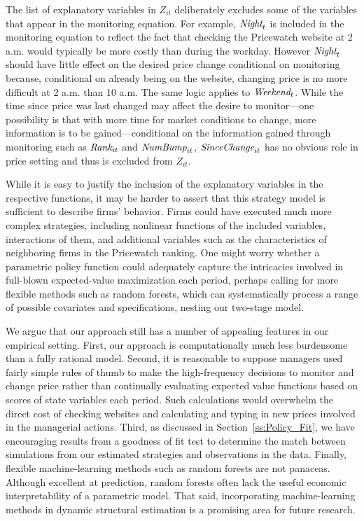 \documentclass[11pt]{article}
\newcommand{\SinceChange}{\mbox{\it SinceChange}}
\newcommand{\Rank}{\mbox{\it Rank}}
\newcommand{\NumBump}{\mbox{\it NumBump}}
\newcommand{\Night}{\mbox{\it Night}}
\newcommand{\Weekend}{\mbox{\it Weekend}}
\begin{document}
\begin{spacing}{1.3}
The list of explanatory variables in $Z_{it}$ deliberately excludes
some of the variables that appear in the monitoring equation. For
example, $\Night_t$ is included in the monitoring equation to reflect
the fact that checking the Pricewatch website at 2 a.m. would
typically be more costly than during the workday. However $\Night_t$
should have little effect on the desired price change conditional on
monitoring because, conditional on already being on the website,
changing price is no more difficult at 2 a.m. than 10 a.m. The same
logic applies to $\Weekend_t$. While the time since price was last
changed may affect the desire to monitor---one possibility is that
with more time for market conditions to change, more information is to
be gained---conditional on the information gained through monitoring
such as $\Rank_{it}$ and $\NumBump_{it}$, $\SinceChange_{it}$ has no
obvious role in price setting and thus is excluded from $Z_{it}$.

While it is easy to justify the inclusion of the explanatory variables
in the respective functions, it may be harder to assert that this
strategy model is sufficient to describe firms' behavior. Firms could
have executed much more complex strategies, including nonlinear
functions of the included variables, interactions of them, and
additional variables such as the characteristics of neighboring firms
in the Pricewatch ranking. One might worry whether a parametric policy
function could adequately capture the intricacies involved in
full-blown expected-value maximization each period, perhaps calling
for more flexible methods such as random forests, which can
systematically process a range of possible covariates and specifications,
nesting our two-stage model.

We argue that our approach still has a number of appealing features in
our empirical setting. First, our approach is computationally much
less burdensome than a fully rational model. Second, it is reasonable
to suppose managers used fairly simple rules of thumb to make the
high-frequency decisions to monitor and change price rather than
continually evaluating expected value functions based on scores of
state variables each period. Such calculations would overwhelm the
direct cost of checking websites and calculating and typing in new
prices involved in the managerial actions.  Third, as discussed in
Section~\ref{ss:Policy_Fit}, we have encouraging results from a
goodness of fit test to determine the match between simulations from
our estimated strategies and observations in the data. Finally,
flexible machine-learning methods such as random forests are not
panaceas. Although excellent at prediction, random forests often lack
the useful economic interpretability of a parametric model. That said, incorporating
machine-learning methods in dynamic structural estimation is a
promising area for future research.


\end{spacing}
\end{document}
